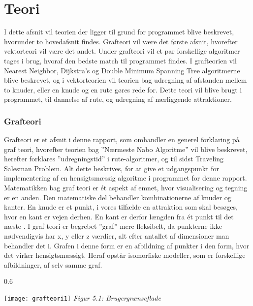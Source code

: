 \chapter{Teori}
I dette afsnit vil teorien der ligger til grund for programmet blive beskrevet, hvorunder to hovedafsnit findes. Grafteori vil være det første afsnit, hvorefter vektorteori vil være det andet. Under grafteori vil et par forskellige algoritmer tages i brug, hvoraf den bedste match til programmet findes. I grafteorien vil Nearest Neighbor, Dijkstra’s og Double Minimum Spanning Tree algoritmerne blive beskrevet, og i vektorteorien vil teorien bag udregning af afstanden mellem to knuder, eller en knude og en rute gøres rede for. Dette teori vil blive brugt i programmet, til dannelse af rute, og udregning af nærliggende attraktioner.

\subsection{Grafteori}
Grafteori er et afsnit i denne rapport, som omhandler en generel forklaring på graf teori, hvorefter teorien bag ”Nærmeste Nabo Algoritme” vil blive beskrevet, herefter forklares ”udregningstid” i rute-algoritmer, og til sidst Traveling Salesman Problem. Alt dette beskrives, for at give et udgangspunkt for implementering af en hensigtsmæssig algoritme i programmet for denne rapport.\newline
Matematikken bag graf teori er ét aspekt af emnet, hvor visualisering og tegning er en anden. Den matematiske del behandler kombinationerne af knuder og kanter. En knude er et punkt, i vores tilfælde en attraktion som skal besøges, hvor en kant er vejen derhen. En kant er derfor længden fra ét punkt til det næste \citep{GraphTheory}.
I graf teori er begrebet ”graf” mere fleksibelt, da punkterne ikke nødvendigvis har x, y eller z værdier, alt efter antallet af dimensioner man behandler det i. Grafen i denne form er en afbildning af punkter i den form, hvor det virker hensigtsmæssigt. Heraf opstår isomorfiske modeller, som er forskellige afbildninger, af selv samme graf. 

\begin{wrapfigure}{}{0.6\textwidth}
  \vspace{-20pt}
  \begin{center}
    \texttt{[image: grafteori1]} \newline
    \textit{Figur 5.1: Brugergrænseflade}\newline
  \end{center}
  \vspace{-20pt}
  \vspace{-20pt}
\end{wrapfigure}

